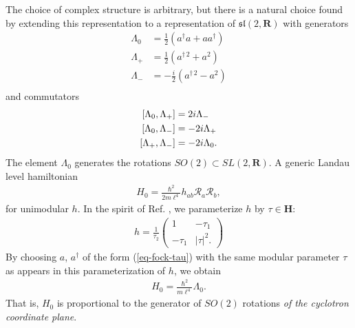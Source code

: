 \documentclass[aps,prb,twocolumn,letterpaper,twoside,nobalancelastpage,groupedaddress,amsmath,amssymb,floatfix,citeautoscript]{revtex4-1}
\begin{document}
The choice of complex structure is arbitrary, but there is a natural choice found by extending this representation to a representation of $\mathfrak{sl}(2,\mathbf{R})$ with generators
\begin{align*}
\Lambda_0 &= \frac{1}{2}\left(a^{\dag}a + aa^{\dag}\right)\\
\Lambda_{+} &= \frac{1}{2}\left(a^{\dag\,2} + a^{2}\right)\\
\Lambda_{-} &= -\frac{i}{2}\left(a^{\dag\,2}- a^{2}\right)\\
\end{align*}
and commutators
\begin{align*}
\comm{\Lambda_0}{\Lambda_+} &= 2i\Lambda_-\\
\comm{\Lambda_0}{\Lambda_-} &= -2i\Lambda_+\\
\comm{\Lambda_+}{\Lambda_-} &= -2i\Lambda_0.
\end{align*}
The element $\Lambda_0$ generates the rotations $SO(2)\subset SL(2,\mathbf{R})$. A generic Landau level hamiltonian
\begin{align*}
H_0 = \frac{\hbar^2}{2m\ell^4}h_{ab}\mathcal{R}_a\mathcal{R}_b,
\end{align*}
for unimodular $h$. In the spirit of Ref. , we parameterize $h$ by $\tau\in\mathbf{H}$:
\begin{align*}
h = \frac{1}{\tau_2}\begin{pmatrix}1&-\tau_1\\
-\tau_1&|\tau|^2.
\end{pmatrix}
\end{align*}
By choosing $a$, $a^{\dag}$ of the form (\ref{eq-fock-tau}) with the same modular parameter $\tau$ as appears in this parameterization of $h$, we obtain
\begin{align*}
H_0 = \frac{\hbar^2}{m\ell^4}\Lambda_0.
\end{align*}
That is, $H_0$ is proportional to the generator of $SO(2)$ rotations \textit{of the cyclotron coordinate plane}.  



\end{document}
